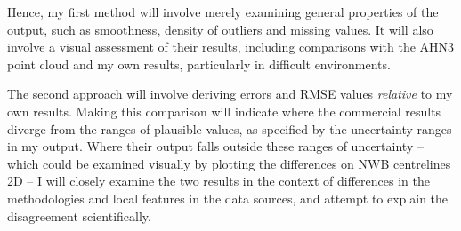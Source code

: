 Hence, my first method will involve merely examining general properties of the output, such as smoothness, density of outliers and missing values. It will also involve a visual assessment of their results, including comparisons with the AHN3 point cloud and my own results, particularly in difficult environments.

The second approach will involve deriving errors and RMSE values \textit{relative} to my own results. Making this comparison will indicate where the commercial results diverge from the ranges of plausible values, as specified by the uncertainty ranges in my output. Where their output falls outside these ranges of uncertainty – which could be examined visually by plotting the differences on NWB centrelines 2D – I will closely examine the two results in the context of differences in the methodologies and local features in the data sources, and attempt to explain the disagreement scientifically.